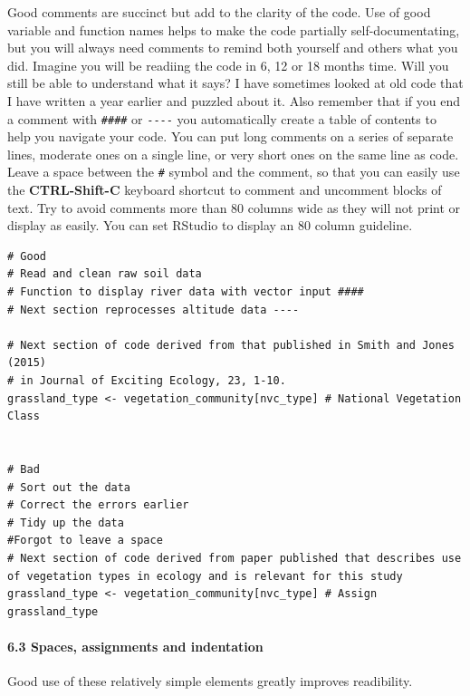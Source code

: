 \documentclass[]{article}
\let\oldparagraph\paragraph
\renewcommand{\paragraph}[1]{\oldparagraph{#1}\mbox{}}
\begin{document}
Good comments are succinct but add to the clarity of the code. Use of
good variable and function names helps to make the code partially
self-documentating, but you will always need comments to remind both
yourself and others what you did. Imagine you will be readiing the code
in 6, 12 or 18 months time. Will you still be able to understand what it
says? I have sometimes looked at old code that I have written a year
earlier and puzzled about it. Also remember that if you end a comment
with \texttt{\#\#\#\#} or \texttt{-\/-\/-\/-} you automatically create a
table of contents to help you navigate your code. You can put long
comments on a series of separate lines, moderate ones on a single line,
or very short ones on the same line as code. Leave a space between the
\texttt{\#} symbol and the comment, so that you can easily use the
\textbf{CTRL-Shift-C} keyboard shortcut to comment and uncomment blocks
of text. Try to avoid comments more than 80 columns wide as they will
not print or display as easily. You can set RStudio to display an 80
column guideline.

\begin{verbatim}
# Good
# Read and clean raw soil data
# Function to display river data with vector input ####
# Next section reprocesses altitude data ----

# Next section of code derived from that published in Smith and Jones (2015)
# in Journal of Exciting Ecology, 23, 1-10.
grassland_type <- vegetation_community[nvc_type] # National Vegetation Class


# Bad
# Sort out the data
# Correct the errors earlier
# Tidy up the data
#Forgot to leave a space
# Next section of code derived from paper published that describes use of vegetation types in ecology and is relevant for this study 
grassland_type <- vegetation_community[nvc_type] # Assign grassland_type
\end{verbatim}

\paragraph{6.3 Spaces, assignments and
indentation}\label{spaces-assignments-and-indentation}

Good use of these relatively simple elements greatly improves
readibility.
\end{document}
